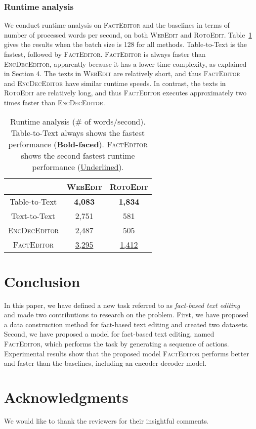 \documentclass[11pt,a4paper]{article}
\begin{document}
\subsubsection*{Runtime analysis}
We conduct runtime analysis on \textsc{FactEditor} and the baselines in terms of number of processed words per second, on both \textsc{WebEdit} and \textsc{RotoEdit}. Table~\ref{tab:runtime} gives the results when the batch size is 128 for all methods. Table-to-Text is the fastest, followed by \textsc{FactEditor}. \textsc{FactEditor} is always faster than \textsc{EncDecEditor}, apparently because it has a lower time complexity, as explained in Section 4. The texts in \textsc{WebEdit} are relatively short, and thus \textsc{FactEditor} and \textsc{EncDecEditor} have similar runtime speeds. In contrast, the texts in \textsc{RotoEdit} are relatively long, and thus \textsc{FactEditor} executes approximately two times faster than \textsc{EncDecEditor}.

\begin{table}[t]
    \centering
    \small
    \begin{tabular}{c|cc}
        \toprule
        & \textsc{WebEdit} & \textsc{RotoEdit}\\\midrule
        Table-to-Text & \textbf{4,083} & \textbf{1,834}\\
        Text-to-Text & 2,751 & 581 \\
        \textsc{EncDecEditor} & 2,487 & 505\\
        \textsc{FactEditor} & \underline{3,295} & \underline{1,412}\\
        \bottomrule
    \end{tabular}
    \caption{Runtime analysis (\# of words/second). Table-to-Text always shows the fastest performance (\textbf{Bold-faced}). \textsc{FactEditor} shows the second fastest runtime performance  (\underline{Underlined}).}
    \label{tab:runtime}
\end{table}

\section{Conclusion}
In this paper, we have defined a new task referred to as \textit{fact-based text editing} and made two contributions to research on the problem. First, we have proposed a data construction method for fact-based text editing and created two datasets. Second, we have proposed a model for fact-based text editing, named \textsc{FactEditor}, which performs the task by generating a sequence of actions. Experimental results show that the proposed model \textsc{FactEditor} performs better and faster than the baselines, including an encoder-decoder model.

\section*{Acknowledgments}
We would like to thank the reviewers for their insightful comments. 


\end{document}
